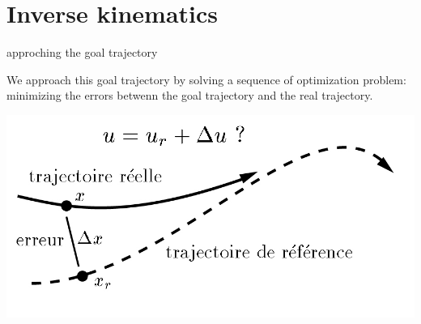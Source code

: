 \documentclass{beamer}
\begin{document}
\section{Inverse kinematics}


\begin{frame}{approching the goal trajectory}

We approach this goal trajectory by solving a sequence of optimization problem: minimizing the errors betwenn the goal trajectory and the real trajectory.
\medskip

\includegraphics[scale = 0.4]{tracking.jpg}\cite{2}
\end{frame}
\end{document}
